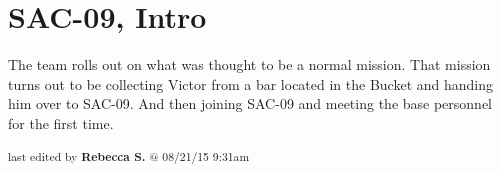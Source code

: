 \setcounter{chapter}{ 0 }
\chapter{\textbf{SAC-09, Intro} }







The team rolls out on what was thought to be a normal mission. That mission turns out to be collecting Victor from a bar located in the Bucket and handing him over to SAC-09. And then joining SAC-09 and meeting the base personnel for the first time.


\vspace{\fill}

\begin{flushright}
\textsubscript{last edited by \textbf{Rebecca S.} @ 08/21/15 9:31am}
\end{flushright}
